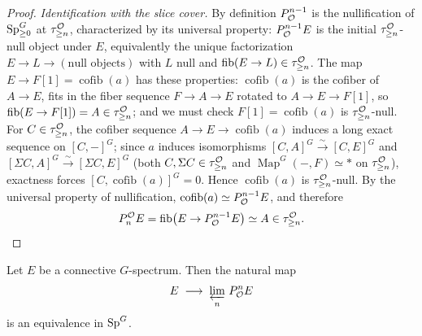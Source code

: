 \begin{proof}
\emph{Identification with the slice cover.} By definition $P^{n-1}_{\mathcal{O}}$ is
the nullification of $\mathrm{Sp}^G_{\ge0}$ at $\tau^{\mathcal{O}}_{\ge n}$, characterized by
its universal property: $P^{n-1}_{\mathcal{O}} E$ is the initial $\tau^{\mathcal{O}}_{\ge n}$-null
object under $E$, equivalently the unique factorization
$E\to L\to(\text{null objects})$ with $L$ null and
$\operatorname{fib}(E\to L)\in\tau^{\mathcal{O}}_{\ge n}$. The map
$E\to F[1]=\operatorname{cofib}(a)$ has these properties:
$\operatorname{cofib}(a)$ is the cofiber of $A\to E$, fits in the fiber sequence
$F\to A\to E$ rotated to $A\to E\to F[1]$, so
$\operatorname{fib}(E\to F[1])=A\in\tau^{\mathcal{O}}_{\ge n}$; and we must check
$F[1]=\operatorname{cofib}(a)$ is $\tau^{\mathcal{O}}_{\ge n}$-null. For
$C\in\tau^{\mathcal{O}}_{\ge n}$, the cofiber sequence $A\to E\to\operatorname{cofib}(a)$
induces a long exact sequence on $[C,-]^G$; since $a$ induces isomorphisms
$[C,A]^G\xrightarrow{\sim}[C,E]^G$ and $[\Sigma C,A]^G\xrightarrow{\sim}[\Sigma C,E]^G$
(both $C,\Sigma C\in\tau^{\mathcal{O}}_{\ge n}$ and
$\operatorname{Map}^G(-,F)\simeq\ast$ on $\tau^{\mathcal{O}}_{\ge n}$), exactness forces
$[C,\operatorname{cofib}(a)]^G=0$. Hence $\operatorname{cofib}(a)$ is
$\tau^{\mathcal{O}}_{\ge n}$-null. By the universal property of nullification,
$\operatorname{cofib}(a)\simeq P^{n-1}_{\mathcal{O}} E$, and therefore
\[
P^{\mathcal{O}}_{n}E=\operatorname{fib}\bigl(E\to P^{n-1}_{\mathcal{O}} E\bigr)\simeq A\in\tau^{\mathcal{O}}_{\ge n}. \qedhere
\]
\end{proof}

\begin{qfivetheorem}\label{thm:converge}
Let $E$ be a connective $G$-spectrum. Then the natural map
\[
E\;\longrightarrow\;\varprojlim_{n}\,P^n_{\mathcal{O}} E
\]
is an equivalence in $\mathrm{Sp}^G$.
\end{qfivetheorem}

